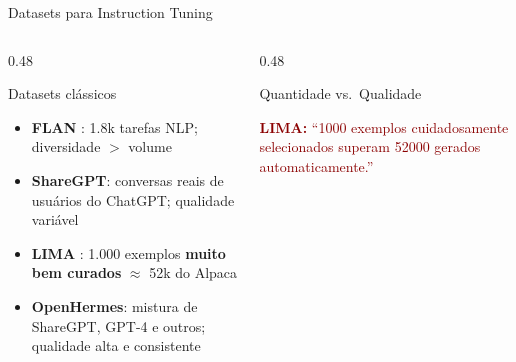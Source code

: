 \documentclass[aspectratio=169, xcolor=dvipsnames]{beamer}
\begin{document}
  \begin{frame}{Datasets para Instruction Tuning}
    \begin{columns}[T]
      \begin{column}{0.48\textwidth}
        \begin{block}{Datasets clássicos}
          \small
          \begin{itemize}
            \item \textbf{FLAN} \cite{chung2022flan}: 1.8k tarefas NLP;
              diversidade $>$ volume
            \item \textbf{ShareGPT}: conversas reais de usuários do ChatGPT;
              qualidade variável
            \item \textbf{LIMA} \cite{zhou2023lima}: 1.000 exemplos
              \textbf{muito bem curados} $\approx$ 52k do Alpaca
            \item \textbf{OpenHermes}: mistura de ShareGPT, GPT-4 e outros;
              qualidade alta e consistente
          \end{itemize}
        \end{block}
      \end{column}
      \begin{column}{0.48\textwidth}
        \begin{block}{Quantidade vs.\ Qualidade}
          \begin{center}
          \end{center}
          \vspace{0.2em}
          \textcolor{DarkRed}{\small \textbf{LIMA:} ``1000 exemplos
          cuidadosamente selecionados superam 52000 gerados automaticamente.''}
        \end{block}
      \end{column}

\end{columns}
\end{frame}
\end{document}
